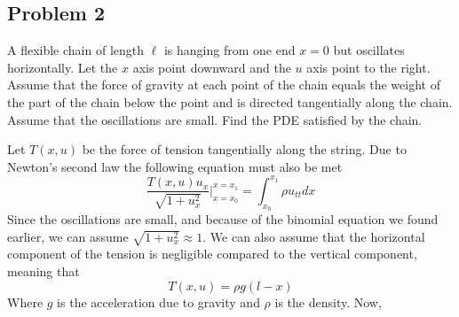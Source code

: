 \documentclass{ben}
\begin{document}
\subsection{Problem 2}
\noindent
A flexible chain of length $\ell$ is hanging from one end $x = 0$ but oscillates
horizontally. Let the $x$ axis point downward and the $u$ axis point to the right.
Assume that the force of gravity at each point of the chain equals the weight
of the part of the chain below the point and is directed tangentially along the
chain. Assume that the oscillations are small. Find the PDE satisfied by the
chain.
\begin{solution}
    Let $T(x, u)$ be the force of tension tangentially along the string. 
    Due to Newton's second law the following equation must also be met
    \[
    \frac{T(x, u)u_x}{\sqrt{1 + u_x^2}} \Bigg|_{x = x_0}^{x = x_1} = \int_{x_0}^{x_1} \rho u_{tt} dx
    \]
    Since the oscillations are small, and because of the binomial equation we found earlier,
    we can assume $\sqrt{1 + u_x^2} \approx 1$. We can also assume that the horizontal component of
    the tension is negligible compared to the vertical component, meaning that
    \[
        T(x, u) = \rho g (l - x)
    \]
    Where $g$ is the acceleration due to gravity and $\rho$ is the density.
    Now, 
\end{solution}
\end{document}
